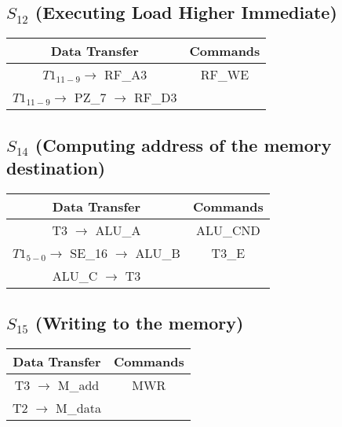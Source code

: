\documentclass[]{article}
\begin{document}
        \subsection*{$S_{12}$ (Executing Load Higher Immediate)} %
        \begin{center}
            \begin{tabular}{|c|c|}
                \hline
                Data Transfer & Commands \\
                \hline
                $T1_{11-9} \to$ RF\_A3 & RF\_WE\\
                $T1_{11-9} \to$ PZ\_7 $\to$ RF\_D3 & \\   %
                \hline
            \end{tabular}
        \end{center}

        \subsection*{$S_{14}$ (Computing address of the memory destination)} %
        \begin{center}
            \begin{tabular}{|c|c|}
                \hline
                Data Transfer & Commands \\
                \hline
                T3 $\to$ ALU\_A & ALU\_CND\\
                $T1_{5-0} \to$ SE\_16 $\to$ ALU\_B & T3\_E\\
                ALU\_C $\to$ T3 & \\
                \hline
            \end{tabular}
        \end{center}
        \subsection*{$S_{15}$ (Writing to the memory)} %
        \begin{center}
            \begin{tabular}{|c|c|}
                \hline
                Data Transfer & Commands \\
                \hline
                T3 $\to$ M\_add & MWR\\
                T2 $\to$ M\_data & \\
                \hline
            \end{tabular}
        \end{center}
\end{document}
